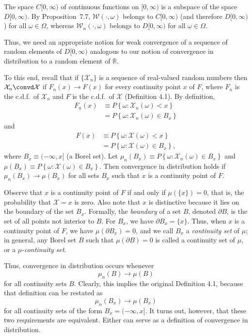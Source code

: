The space $C[0,\infty)$ of continuous functions on $[0,\infty)$ is a subspace of the space $D[0,\infty)$. By Proposition~7.7, $\mathcal{W}(\cdot, \omega)$ belongs to $C[0,\infty)$ (and therefore $D[0,\infty)$) for all $\omega \in \Omega$, whereas $\mathcal{W}_n(\cdot, \omega)$ belongs to $D[0,\infty)$ for all $\omega \in \Omega$.

Thus, we need an appropriate notion for weak convergence of a sequence of random elements of $D[0,\infty)$ analogous to our notion of convergence in distribution to a random element of $\mathbb{R}$.

To this end, recall that if $\{\mathcal{X}_n\}$ is a sequence of real-valued random numbers then $\mathcal{X}_n \convd \mathcal{X}$ if $F_n(x) \to F(x)$ for every continuity point $x$ of $F$, where $F_n$ is the c.d.f.\ of $\mathcal{X}_n$ and $F$ is the c.d.f.\ of $\mathcal{X}$ (Definition 4.1). By definition,
\begin{align*}
F_n(x) &\equiv P\left\{\omega : \mathcal{X}_n(\omega) < x\right\} \\
&= P\left\{\omega : \mathcal{X}_n(\omega) \in B_x\right\}
\end{align*}
and
\begin{align*}
F(x) &\equiv P\left\{\omega : \mathcal{X}(\omega) < x\right\} \\
&= P\left\{\omega : \mathcal{X}(\omega) \in B_x\right\},
\end{align*}
where $B_x \equiv (-\infty, x]$ (a Borel set). Let $\mu_n(B_x) \equiv P\left\{\omega : \mathcal{X}_n(\omega) \in B_x\right\}$ and $\mu(B_x) \equiv P\left\{\omega : \mathcal{X}(\omega) \in B_x\right\}$. Then convergence in distribution holds if $\mu_n(B_x) \to \mu(B_x)$ for all sets $B_x$ such that $x$ is a continuity point of $F$.

Observe that $x$ is a continuity point of $F$ if and only if $\mu(\{x\}) = 0$, that is, the probability that $\mathcal{X} = x$ is zero. Also note that $x$ is distinctive because it lies on the boundary of the set $B_x$. Formally, the \emph{boundary} of a set $B$, denoted $\partial B$, is the set of all points not interior to $B$. For $B_x$, we have $\partial B_x = \{x\}$. Thus, when $x$ is a continuity point of $F$, we have $\mu(\partial B_x) = 0$, and we call $B_x$ a \emph{continuity set} of $\mu$; in general, any Borel set $B$ such that $\mu(\partial B) = 0$ is called a continuity set of $\mu$, or a $\mu$-\emph{continuity set}.

Thus, convergence in distribution occurs whenever
\[
\mu_n(B) \to \mu(B)
\]
for all continuity sets $B$. Clearly, this implies the original Definition 4.1, because that definition can be restated as
\[
\mu_n(B_x) \to \mu(B_x)
\]
for all continuity sets of the form $B_x = (-\infty, x]$. It turns out, however, that these two requirements are equivalent. Either can serve as a definition of convergence in distribution.

